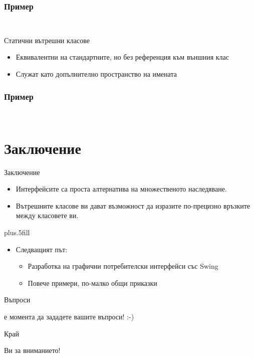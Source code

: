 \documentclass{beamer}
\begin{document}
\begin{frame}[fragile]
  \frametitle{Пример}
  \transdissolve
\begin{lstlisting}
  
\end{lstlisting}
\end{frame}

\begin{frame}{Статични вътрешни класове}
  \transdissolve
  \begin{itemize}
  \item Еквивалентни на стандартните, но без референция към външния
    клас
  \item Служат като допълнително пространство на имената
  \end{itemize}
\end{frame}

\begin{frame}[fragile]
  \frametitle{Пример}
  \transdissolve
\begin{lstlisting}
  
\end{lstlisting}
\end{frame}


\section*{Заключение}

\begin{frame}{Заключение}
  \transdissolve
  \begin{itemize}
  \item
    Интерфейсите са проста алтернатива на множественото наследяване.
  \item
    Вътрешните класове ви дават възможност да изразите по-прецизно
    връзките между класовете ви.
  \end{itemize}
  
  \vskip0pt plus.5fill
  \begin{itemize}
  \item
    Следващият път:
    \begin{itemize}
    \item
      Разработка на графични потребителски интерфейси със Swing
    \item
      Повече примери, по-малко общи приказки
    \end{itemize}
  \end{itemize}
\end{frame}

\begin{frame}{Въпроси}
  \transdissolve
  \begin{center}
     е момента да зададете вашите въпроси! :-)
  \end{center}
\end{frame}

\begin{frame}{Край}
  \transdissolve
  \begin{center}
     Ви за вниманието!
  \end{center}
\end{frame}
\end{document}
